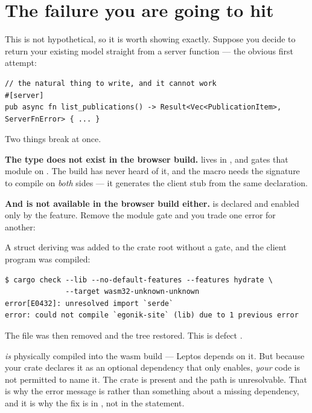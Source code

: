 \section{The failure you are going to hit}

This is not hypothetical, so it is worth showing exactly. Suppose you decide to return your
existing model straight from a server function --- the obvious first attempt:

\begin{lstlisting}[style=rs]
// the natural thing to write, and it cannot work
#[server]
pub async fn list_publications() -> Result<Vec<PublicationItem>, ServerFnError> { ... }
\end{lstlisting}

Two things break at once.

\textbf{The type does not exist in the browser build.}  lives in
, and  gates that module on . The
 build has never heard of it, and the \code{\#[server]} macro needs the signature to
compile on \emph{both} sides --- it generates the client stub from the same declaration.

\textbf{And  is not available in the browser build either.}  is declared
 and enabled only by the  feature. Remove the module gate and you
trade one error for another:

\begin{verified}
A struct deriving  was added to the crate root without a  gate,
and the client program was compiled:
\begin{lstlisting}[style=out]
$ cargo check --lib --no-default-features --features hydrate \
              --target wasm32-unknown-unknown
error[E0432]: unresolved import `serde`
error: could not compile `egonik-site` (lib) due to 1 previous error
\end{lstlisting}
The file was then removed and the tree restored. This is defect .
\end{verified}

\begin{pitfall}
 \emph{is} physically compiled into the wasm build --- Leptos depends on it. But
because your crate declares it as an optional dependency that only \code{ssr} enables, \emph{your}
code is not permitted to name it. The crate is present and the path is unresolvable. That is why
the error message is \code{unresolved import} rather than something about a missing dependency,
and it is why the fix is in \file{Cargo.toml}, not in the \code{use} statement.
\end{pitfall}


